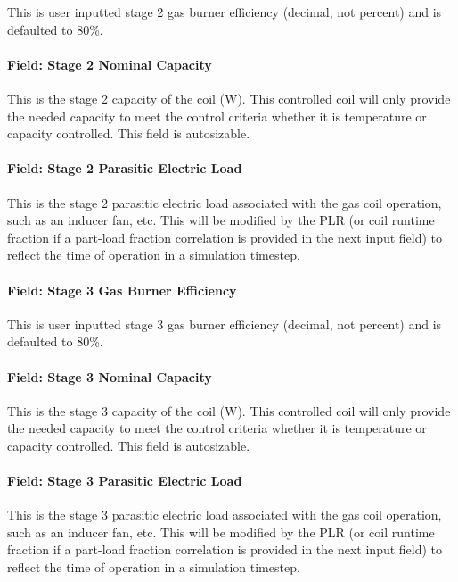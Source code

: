 This is user inputted stage 2 gas burner efficiency (decimal, not percent) and is defaulted to 80\%.

\paragraph{Field: Stage 2 Nominal Capacity}\label{field-stage-2-nominal-capacity-1}

This is the stage 2 capacity of the coil (W). This controlled coil will only provide the needed capacity to meet the control criteria whether it is temperature or capacity controlled. This field is autosizable.

\paragraph{Field: Stage 2 Parasitic Electric Load}\label{field-stage-2-parasitic-electric-load}

This is the stage 2 parasitic electric load associated with the gas coil operation, such as an inducer fan, etc. This will be modified by the PLR (or coil runtime fraction if a part-load fraction correlation is provided in the next input field) to reflect the time of operation in a simulation timestep.

\paragraph{Field: Stage 3 Gas Burner Efficiency}\label{field-stage-3-gas-burner-efficiency}

This is user inputted stage 3 gas burner efficiency (decimal, not percent) and is defaulted to 80\%.

\paragraph{Field: Stage 3 Nominal Capacity}\label{field-stage-3-nominal-capacity-1}

This is the stage 3 capacity of the coil (W). This controlled coil will only provide the needed capacity to meet the control criteria whether it is temperature or capacity controlled. This field is autosizable.

\paragraph{Field: Stage 3 Parasitic Electric Load}\label{field-stage-3-parasitic-electric-load}

This is the stage 3 parasitic electric load associated with the gas coil operation, such as an inducer fan, etc. This will be modified by the PLR (or coil runtime fraction if a part-load fraction correlation is provided in the next input field) to reflect the time of operation in a simulation timestep.

